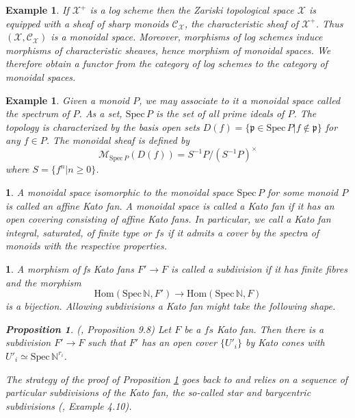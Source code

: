 \documentclass{amsart}%
\numberwithin{equation}{subsection}
\theoremstyle{plain2}
\newtheorem{prop}[equation]{Proposition}
\theoremstyle{definition2}
\newtheorem{example}[equation]{Example}
\theoremstyle{stepstyle}
\theoremstyle{point}
\theoremstyle{subpoint}
\newtheorem{subpoint}[equation]{}%
\newcommand{\spa}[1]{\begin{subpoint}#1\end{subpoint}}           %
\newcommand{\N}{\ensuremath{\mathbb{N}}}
\newcommand{\cX}{\ensuremath{\mathscr{X}}}
\newcommand{\fp}{\ensuremath{\mathfrak{p}}}
\newcommand{\caM}{\ensuremath{\mathcal{M}}}
\newcommand{\caC}{\ensuremath{\mathcal{C}}}
\newcommand{\Spec}{\ensuremath{\mathrm{Spec}\,}}
\newcommand{\Hom}{\mathrm{Hom}}
\begin{document}
\begin{example}
If $\cX^+$ is a log scheme then the Zariski topological space $\cX$ is equipped with a sheaf of sharp monoids $\caC_{\cX}$, the characteristic sheaf of $\cX^+$. Thus $(\cX,\caC_{\cX})$ is a monoidal space. Moreover, morphisms of log schemes
induce morphisms of characteristic sheaves, hence morphism of monoidal spaces. We therefore obtain a functor from the category of log schemes to the category of monoidal spaces.
\end{example}

\begin{example}
Given a monoid $P$, we may associate to it a monoidal space called the spectrum of $P$. As a set, $\Spec P$ is the set of all prime ideals of $P$. The topology is characterized by the basis open sets $D(f)= \{ \fp \in \Spec P | f \notin \fp \}$ for any $f \in P$. The monoidal sheaf is defined by $$\caM_{\Spec P} (D(f))= S^{-1}P / (S^{-1}P)^{\times}$$ where $S=\{f^n | n \geqslant 0\}$.
\end{example}

\spa{A monoidal space isomorphic to the monoidal space $\Spec P$ for some monoid $P$ is called an affine Kato fan. A monoidal space is called a Kato fan if it has an open covering consisting of affine Kato fans. In particular, we call a Kato fan integral, saturated, of finite type or $fs$ if it admits a cover by the spectra of monoids with the respective properties.}

\spa{A morphism of fs Kato fans $F' \rightarrow F$ is called a \emph{subdivision} if it has finite fibres and the morphism $$\Hom(\Spec \N, F') \rightarrow \Hom (\Spec \N, F)$$ is a bijection. Allowing subdivisions a Kato fan might take the following shape.
\begin{prop} \label{kato subdivision}(\cite{Kato1994a}, Proposition 9.8)
Let $F$ be a $fs$ Kato fan. Then there is a subdivision $F' \rightarrow F$ such that $F'$ has an open cover $\{U'_i\}$ by Kato cones with $U'_i \simeq \Spec \N^{r_i}$. 
\end{prop}
The strategy of the proof of Proposition \ref{kato subdivision} goes back to \cite{KempfKnudsenMumfordEtAl1973} and relies on a sequence of particular subdivisions of the Kato fan, the so-called star and barycentric subdivisions (\cite{AbramovichChenMarcusEtAl2015}, Example 4.10).}
\end{document}
